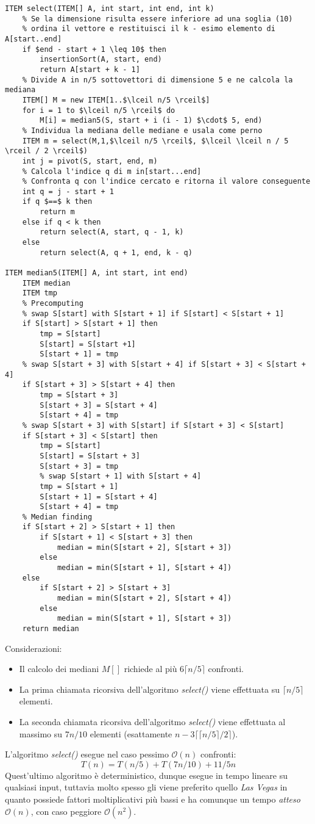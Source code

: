\documentclass[../cheatSheetAlgoritmi.tex]{subfiles}
\begin{document}
\begin{lstlisting}[caption=Mediana deterministica in $\mathcal{O}(n)$]
ITEM select(ITEM[] A, int start, int end, int k)
	% Se la dimensione risulta essere inferiore ad una soglia (10) 
	% ordina il vettore e restituisci il k - esimo elemento di A[start..end]
	if $end - start + 1 \leq 10$ then 
		insertionSort(A, start, end)
		return A[start + k - 1]
	% Divide A in n/5 sottovettori di dimensione 5 e ne calcola la mediana
	ITEM[] M = new ITEM[1..$\lceil n/5 \rceil$]
	for i = 1 to $\lceil n/5 \rceil$ do
		M[i] = median5(S, start + i (i - 1) $\cdot$ 5, end)
	% Individua la mediana delle mediane e usala come perno
	ITEM m = select(M,1,$\lceil n/5 \rceil$, $\lceil \lceil n / 5 \rceil / 2 \rceil$)
	int j = pivot(S, start, end, m)
	% Calcola l'indice q di m in[start...end]
	% Confronta q con l'indice cercato e ritorna il valore conseguente
	int q = j - start + 1
	if q $==$ k then
		return m
	else if q < k then
		return select(A, start, q - 1, k)
	else
		return select(A, q + 1, end, k - q)

ITEM median5(ITEM[] A, int start, int end)
	ITEM median
	ITEM tmp 
	% Precomputing
	% swap S[start] with S[start + 1] if S[start] < S[start + 1] 
	if S[start] > S[start + 1] then
		tmp = S[start]
		S[start] = S[start +1]
		S[start + 1] = tmp
	% swap S[start + 3] with S[start + 4] if S[start + 3] < S[start + 4] 
	if S[start + 3] > S[start + 4] then
		tmp = S[start + 3]
		S[start + 3] = S[start + 4]
		S[start + 4] = tmp
	% swap S[start + 3] with S[start] if S[start + 3] < S[start] 
	if S[start + 3] < S[start] then
		tmp = S[start]
		S[start] = S[start + 3]
	 	S[start + 3] = tmp
	 	% swap S[start + 1] with S[start + 4]
		tmp = S[start + 1]
		S[start + 1] = S[start + 4]
		S[start + 4] = tmp 
	% Median finding
	if S[start + 2] > S[start + 1] then
		if S[start + 1] < S[start + 3] then
			median = min(S[start + 2], S[start + 3]) 
		else 
			median = min(S[start + 1], S[start + 4])
	else
		if S[start + 2] > S[start + 3] 
			median = min(S[start + 2], S[start + 4]) 
		else 
			median = min(S[start + 1], S[start + 3]) 
	return median
\end{lstlisting}
Considerazioni:
\begin{itemize}
	\item Il calcolo dei mediani $M[ ]$ richiede al più $6 \lceil n/5 \rceil$ confronti. 
	\item La prima chiamata ricorsiva dell'algoritmo \emph{select()} viene effettuata su  $\lceil n/5 \rceil$ elementi.
	\item La seconda chiamata ricorsiva dell’algoritmo \emph{select()} viene effettuata al massimo su $7n/10$ elementi (esattamente $n - 3 \lceil \lceil n/5 \rceil /2 \rceil$).  
\end{itemize}
L'algoritmo \emph{select()} esegue nel caso pessimo $\mathcal{O}(n)$ confronti:
\begin{equation*}
    T(n) = T(n/5) + T(7n/10) + 11/5 n
\end{equation*}
Quest'ultimo algoritmo è deterministico, dunque esegue in tempo lineare su qualsiasi input, tuttavia molto spesso gli viene preferito quello \emph{Las Vegas} in quanto possiede fattori moltiplicativi più bassi e ha comunque un tempo \emph{atteso} $\mathcal{O}(n)$, con caso peggiore $\mathcal{O}(n^2)$.
\end{document}
